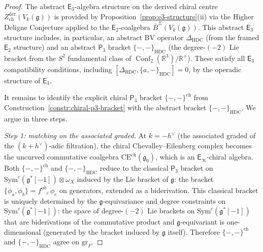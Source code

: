 \documentclass[11pt,reqno]{amsart}
\theoremstyle{definition}
\theoremstyle{remark}
\newcommand{\CE}{\mathrm{CE}}
\newcommand{\Etwo}{\mathsf{E}_{2}}
\newcommand{\Ethree}{\mathsf{E}_{3}}
\newcommand{\Einf}{\mathsf{E}_{\infty}}
\newcommand{\Pthree}{\mathsf{P}_{3}}
\newcommand{\Sym}{\mathrm{Sym}}
\DeclareMathOperator{\Conf}{Conf}
\newcommand{\fg}{\mathfrak{g}}
\newcommand{\BarSig}{\overline{B}^{\Sigma}}
\newcommand{\RR}{\mathbb{R}}
\numberwithin{equation}{section}
\begin{document}
\begin{proof}
The abstract $\Ethree$-algebra structure on the derived
chiral centre $Z^{\mathrm{der}}_{\mathrm{ch}}(V_k(\fg))$
is provided by Proposition~\ref{prop:e3-structure}(ii)
via the Higher Deligne Conjecture applied to the
$\Etwo$-coalgebra $\BarSig(V_k(\fg))$.
This abstract $\Ethree$ structure includes, in particular,
an abstract BV operator $\Delta_{\mathrm{HDC}}$
(from the framed $\Etwo$ structure) and an abstract
$\Pthree$ bracket $\{-,-\}_{\mathrm{HDC}}$
(the degree-$(-2)$ Lie bracket from the $S^2$ fundamental
class of $\Conf_2(\RR^3)/\RR^+$). These satisfy all
$\Ethree$ compatibility conditions, including
$[\Delta_{\mathrm{HDC}}, \{a, -\}_{\mathrm{HDC}}] = 0$,
by the operadic structure of $\Ethree$.

It remains to identify the explicit chiral $\Pthree$
bracket $\{-,-\}^{\mathrm{ch}}$ from
Construction~\ref{constr:chiral-p3-bracket} with
the abstract bracket $\{-,-\}_{\mathrm{HDC}}$. We argue
in three steps.

\textit{Step 1: matching on the associated graded.}
At $k = -h^\vee$ (the associated graded of the
$(k+h^\vee)$-adic filtration), the chiral
Chevalley--Eilenberg complex becomes the uncurved
commutative coalgebra $\CE^{\mathrm{ch}}(\fg_0)$,
which is an $\Einf$-chiral algebra.
Both $\{-,-\}^{\mathrm{ch}}$ and $\{-,-\}_{\mathrm{HDC}}$
reduce to the classical $\Pthree$ bracket on
$\Sym^c(\fg^*[-1]) \otimes \omega_X$ induced by the Lie
bracket of $\fg$: the bracket
$\{\phi_a, \phi_b\} = f^{ab}{}_c\,\phi_c$ on generators,
extended as a biderivation.
This classical bracket is uniquely determined by the
$\fg$-equivariance and degree constraints on
$\Sym^c(\fg^*[-1])$: the space of degree-$(-2)$
Lie brackets on $\Sym^c(\fg^*[-1])$ that are
biderivations of the commutative product and
$\fg$-equivariant is one-dimensional (generated by the
bracket induced by $\fg$ itself). Therefore
$\{-,-\}^{\mathrm{ch}}$ and $\{-,-\}_{\mathrm{HDC}}$
agree on $\mathrm{gr}_F$.


\end{proof}
\end{document}
